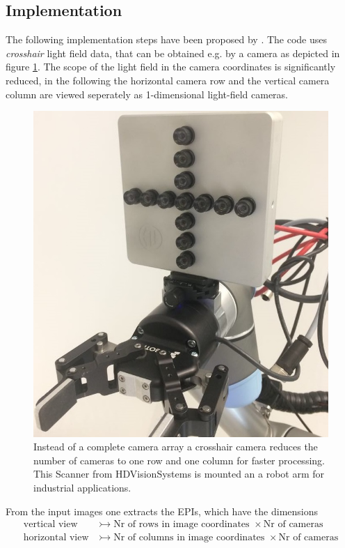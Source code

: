 \documentclass  [
  paper    = a4,
  BCOR     = 10mm,
  twoside,
  fontsize = 12pt,
  fleqn,
  toc      = bibnumbered,
  toc      = listofnumbered,
  numbers  = noendperiod,
  headings = normal,
  listof   = leveldown,
  version  = 3.03
]                                       {scrreprt}
\begin{document}
 \subsection{Implementation}
 The following implementation steps have been proposed by \cite{wanner2014orientation}. The code uses \textit{crosshair} light field data, that can be obtained e.g. by a camera as depicted in figure \ref{fig:lumiplus}. The scope of the light field in the camera coordinates is significantly reduced, in the following the horizontal camera row and the vertical camera column are viewed seperately as 1-dimensional light-field cameras.\\
 \begin{figure}[]
 	\centering
 	\includegraphics[width=0.7\linewidth]{images/Lumiplus}
 	\caption[LumiPlus Scanner from HDVisionSystems]{Instead of a complete camera array a crosshair camera reduces the number of cameras to one row and one column for faster processing. This Scanner from HDVisionSystems is mounted an a robot arm for industrial applications.}
 	\label{fig:lumiplus}
 \end{figure}
 
 From the input images one extracts the EPIs, which have the dimensions
 \begin{align*}
 \text{vertical view}&\rightarrowtail \text{Nr of rows in image coordinates }\times \text{Nr of cameras}\\
 \text{horizontal view}&\rightarrowtail \text{Nr of columns in image coordinates }\times \text{Nr of cameras}
 \end{align*}
 
\end{document}
